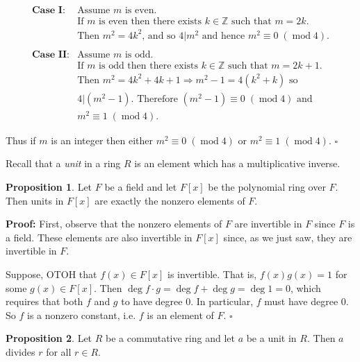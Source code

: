 \documentclass[11pt, oneside]{article}   	%
\theoremstyle{definition}
\newtheorem{proposition}{Proposition}[section]
\DeclareMathOperator{\mymod}{\text{mod}}
\begin{document}
\begin{equation*}
\begin{array}{llll} 
\textbf{Case I:}    
& \text{Assume $m$ is even.} \\
& \text{If $m$ is even then there exists $k \in \mathbb{Z}$ such that $m = 2k$.} \\
& \text{Then $m^2 = 4k^2$, and so $4 \lvert m^2$ and hence $m^2 \equiv 0 \; (\mymod 4)$.} \\ \\
\textbf{Case II:}    
& \text{Assume $m$ is odd.} \\
& \text{If $m$ is odd then there exists $k \in \mathbb{Z}$ such that $m = 2k + 1$.} \\
& \text{Then $m^2 = 4k^2 +4k + 1 \Rightarrow m^2 - 1 = 4(k^2 + k)$ so}                       \\
& \text{$4 \lvert (m^2 - 1)$.  Therefore $(m^2 - 1)  \equiv 0 \; (\mymod 4)$ and}      \\
&m^2 \equiv 1 \; (\mymod 4).
\end{array}
\end{equation*}


\bigskip
\noindent
Thus if $m$ is an integer then either $m^2 \equiv 0 \; (\mymod 4)$ or $m^2 \equiv 1 \; (\mymod 4)$. $\square$

\bigskip
\noindent
Recall that a \emph{unit} in a ring $R$ is an element which has a multiplicative inverse. 

\begin{proposition}
Let $F$ be a field and let $F[x]$ be the polynomial ring over $F$. Then units in $F[x]$ are exactly the nonzero elements of $F$.
\end{proposition}

\noindent 
\textbf{Proof:}  First, observe that the nonzero elements of $F$ are invertible in $F$ since $F$ is a field.  These elements are 
also invertible in $F[x]$ since, as we just saw,  they are invertible in $F$. 

\bigskip
\noindent
Suppose, OTOH  that $f(x) \in F[x] $ is invertible. That is, $f(x)g(x) = 1$ 
for some $g(x) \in F [x]$. Then $\deg f \cdot g = \deg f + \deg g = \deg 1 = 0$,
which requires that both $f$ and $g$ to have degree 0. In particular, $f$ 
must have degree 0. So $f$ is a nonzero constant, i.e. $f$ is an element of $F$. $\square$


\begin{proposition}
Let $R$ be a commutative ring and let $a$ be a unit in $R$. Then $a$ divides $r$  for all $r \in R$.
\end{proposition}
\end{document}
